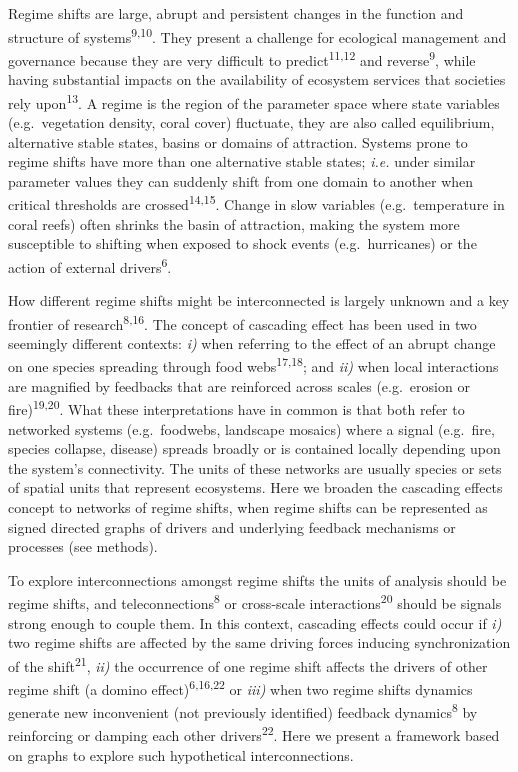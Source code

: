 \documentclass[9pt,]{article}
\begin{document}
Regime shifts are large, abrupt and persistent changes in the function
and structure of systems\textsuperscript{9,10}. They present a challenge
for ecological management and governance because they are very difficult
to predict\textsuperscript{11,12} and reverse\textsuperscript{9}, while
having substantial impacts on the availability of ecosystem services
that societies rely upon\textsuperscript{13}. A regime is the region of
the parameter space where state variables (e.g.~vegetation density,
coral cover) fluctuate, they are also called equilibrium, alternative
stable states, basins or domains of attraction. Systems prone to regime
shifts have more than one alternative stable states; \emph{i.e.} under
similar parameter values they can suddenly shift from one domain to
another when critical thresholds are crossed\textsuperscript{14,15}.
Change in slow variables (e.g.~temperature in coral reefs) often shrinks
the basin of attraction, making the system more susceptible to shifting
when exposed to shock events (e.g.~hurricanes) or the action of external
drivers\textsuperscript{6}.

How different regime shifts might be interconnected is largely unknown
and a key frontier of research\textsuperscript{8,16}. The concept of
cascading effect has been used in two seemingly different contexts:
\emph{i)} when referring to the effect of an abrupt change on one
species spreading through food webs\textsuperscript{17,18}; and
\emph{ii)} when local interactions are magnified by feedbacks that are
reinforced across scales (e.g.~erosion or fire)\textsuperscript{19,20}.
What these interpretations have in common is that both refer to
networked systems (e.g.~foodwebs, landscape mosaics) where a signal
(e.g.~fire, species collapse, disease) spreads broadly or is contained
locally depending upon the system's connectivity. The units of these
networks are usually species or sets of spatial units that represent
ecosystems. Here we broaden the cascading effects concept to networks of
regime shifts, when regime shifts can be represented as signed directed
graphs of drivers and underlying feedback mechanisms or processes (see
methods).

To explore interconnections amongst regime shifts the units of analysis
should be regime shifts, and teleconnections\textsuperscript{8} or
cross-scale interactions\textsuperscript{20} should be signals strong
enough to couple them. In this context, cascading effects could occur if
\emph{i)} two regime shifts are affected by the same driving forces
inducing synchronization of the shift\textsuperscript{21}, \emph{ii)}
the occurrence of one regime shift affects the drivers of other regime
shift (a domino effect)\textsuperscript{6,16,22} or \emph{iii)} when two
regime shifts dynamics generate new inconvenient (not previously
identified) feedback dynamics\textsuperscript{8} by reinforcing or
damping each other drivers\textsuperscript{22}. Here we present a
framework based on graphs to explore such hypothetical interconnections.
\end{document}
